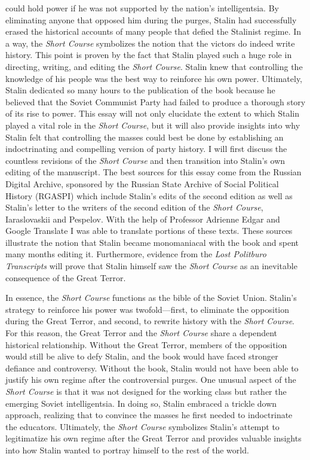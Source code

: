 \documentclass[a4paper, twocolumn]{article}
\begin{document}
could hold power if he was not supported by the nation’s
intelligentsia. By eliminating anyone that opposed him during the
purges, Stalin had successfully erased the historical accounts of many
people that defied the Stalinist regime. In a way, the \emph{Short Course}
symbolizes the notion that the victors do indeed write history. This
point is proven by the fact that Stalin played such a huge role in
directing, writing, and editing the \emph{Short Course}. Stalin knew that
controlling the knowledge of his people was the best way to reinforce
his own power. Ultimately, Stalin dedicated so many hours to the
publication of the book because he believed that the Soviet Communist Party
had failed to produce a thorough story of its rise to power.
This essay will not only elucidate the extent to which Stalin played a
vital role in the \emph{Short Course}, but it will also provide insights into
why Stalin felt that controlling the masses could best be done by
establishing an indoctrinating and compelling version of party
history. I will first discuss the countless revisions of the \emph{Short
Course} and then transition into Stalin's own editing of the
manuscript. The best sources for this essay come from the Russian
Digital Archive, sponsored by the Russian State Archive of Social
Political History (RGASPI) which include Stalin’s edits of the second
edition as well as Stalin's letter to the writers of the second
edition of the \emph{Short Course}, Iaraslovaskii and Pespelov. With the help
of Professor Adrienne Edgar and Google Translate I was able to
translate portions of these texts. These sources illustrate
the notion that Stalin became monomaniacal with the book and
spent many months editing it. Furthermore, evidence from the \emph{Lost
Politburo Transcripts} will prove that Stalin himself saw the
\emph{Short Course} as an inevitable consequence of the Great Terror.

In essence, the \emph{Short Course} functions as the bible of the
Soviet Union. Stalin's strategy to reinforce his power was
twofold—first, to eliminate the opposition during the Great
Terror, and second, to rewrite history with the \emph{Short
  Course}. For this reason, the Great Terror and the \emph{Short
  Course} share a dependent historical relationship. Without the
Great Terror, members of the opposition would still be alive
to defy Stalin, and the book would have faced stronger
defiance and controversy. Without the book, Stalin would not
have been able to justify his own regime after the
controversial purges. One unusual aspect of the \emph{Short Course}
is that it was not designed for the working class but rather
the emerging Soviet intelligentsia. In doing so, Stalin
embraced a trickle down approach, realizing that to convince
the masses he first needed to indoctrinate the
educators. Ultimately, the \emph{Short Course} symbolizes Stalin's
attempt to legitimatize his own regime after the Great Terror
and provides valuable insights into how Stalin wanted to
portray himself to the rest of the world.
\end{document}
